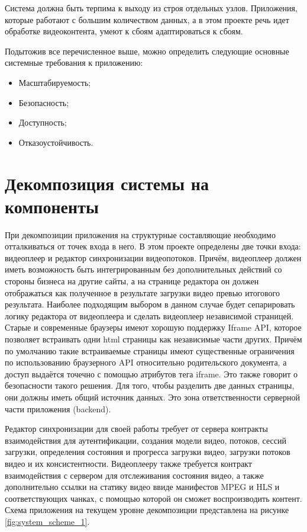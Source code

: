 	Система должна быть терпима к выходу из строя отдельных узлов. Приложения, которые работают с большим количеством данных, а в этом проекте речь идет обработке видеоконтента, умеют к сбоям адаптироваться к сбоям.
	
	Подытожив все перечисленное выше, можно определить следующие основные системные требования к приложению:
	\begin{itemize}[label=$\bullet$]
		\item Масштабируемость;
		\item Безопасность;
		\item Доступность;
		\item Отказоустойчивость.
	\end{itemize}

\section{Декомпозиция системы на компоненты} \label{ch2:decomposition}

	При декомпозиции приложения на структурные составляющие необходимо отталкиваться от точек входа в него. В этом проекте определены две точки входа: видеоплеер и редактор синхронизации видеопотоков. Причём, видеоплеер должен иметь возможность быть интегрированным без дополнительных действий со стороны бизнеса на другие сайты, а на странице редактора он должен отображаться как полученное в результате загрузки видео превью итогового результата. Наиболее подходящим выбором в данном случае будет сепарировать логику редактора от видеоплеера и сделать видеоплеер независимой страницей. Старые и современные браузеры имеют хорошую поддержку Iframe API, которое позволяет встраивать одни html страницы как независимые части других. Причём по умолчанию такие встраиваемые страницы имеют существенные ограничения по использованию браузерного API относительно родительского документа, а доступ выдаётся точечно с помощью атрибутов тега iframe. Это также говорит о безопасности такого решения. Для того, чтобы разделить две данных страницы, они должны иметь общий источник данных. Это зона ответственности серверной части приложения (backend).

	Редактор синхронизации для своей работы требует от сервера контракты взаимодействия для аутентификации, создания модели видео, потоков, сессий загрузки, определения состояния и прогресса загрузки видео, загрузки потоков видео и их консистентности. Видеоплееру также требуется контракт взаимодействия с сервером для отслеживания состояния видео, а также дополнительно ссылки на статику видео ввиде манифестов MPEG и HLS и соответствующих чанках, с помощью которой он сможет воспроизводить контент. Схема приложения на текущем уровне декомпозиции представлена на рисунке \ref{fig:system_scheme_1}.

